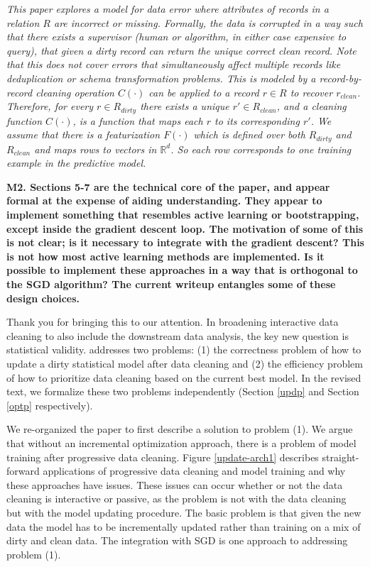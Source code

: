 \emph{This paper explores a model for data error where attributes of records in a relation $R$ are incorrect or missing.
Formally, the data is corrupted in a way such that there exists a supervisor (human or algorithm, in either case expensive to query), that given a dirty record can return the unique correct clean record.
Note that this does not cover errors that simultaneously affect multiple records like deduplication or schema transformation problems.
This is modeled by a record-by-record cleaning operation $C(\cdot)$ can be applied to a record $r \in R$ to recover $r_{clean}$.
Therefore, for every $r \in R_{dirty}$ there exists a unique $r' \in R_{clean}$, and a cleaning function $C(\cdot)$, is a function that maps each $r$ to its corresponding $r'$.
We assume that there is a featurization $F(\cdot)$ which is defined over both $R_{dirty}$ and $R_{clean}$ and maps rows to vectors in $\mathbb{R}^d$.
So each row corresponds to one training example in the predictive model.}

\vspace{0.5em}

\noindent\textbf{M2. Sections 5-7 are the technical core of the paper, and appear formal at the expense of aiding understanding. They appear to implement something that resembles active learning or bootstrapping, except inside the gradient descent loop. The motivation of some of this is not clear; is it necessary to integrate with the gradient descent? This is not how most active learning methods are implemented. Is it possible to implement these approaches in a way that is orthogonal to the SGD algorithm? The current writeup entangles some of these design choices.} 

Thank you for bringing this to our attention. 
In broadening interactive data cleaning to also include the downstream data analysis, the key new question is statistical validity.
\sys addresses two problems: (1) the correctness problem of how to update a dirty statistical model after data cleaning and (2) the efficiency problem of how to prioritize data cleaning based on the current best model.
In the revised text, we formalize these two problems independently (Section \ref{updp} and Section \ref{optp} respectively).

We re-organized the paper to first describe a solution to problem (1). We argue that without an incremental optimization approach, there is a problem of model training after progressive data cleaning. Figure \ref{update-arch1} describes straight-forward applications of progressive data cleaning and model training and why these approaches have issues.
These issues can occur whether or not the data cleaning is interactive or passive, as the problem is not with the data cleaning but with the model updating procedure.
The basic problem is that given the new data the model has to be incrementally updated rather than training on a mix of dirty and clean data.
The integration with SGD is one approach to addressing problem (1).

